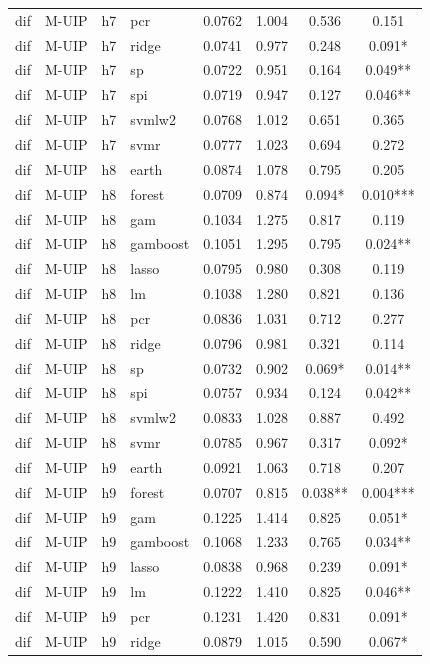 \begin{ThreePartTable}
\begin{longtable}[t]{llclcccc}
dif & M-UIP & h7 & pcr & 0.0762 & 1.004 & 0.536 & 0.151\\
dif & M-UIP & h7 & ridge & 0.0741 & 0.977 & 0.248 & 0.091*\\
dif & M-UIP & h7 & sp & 0.0722 & 0.951 & 0.164 & 0.049**\\
dif & M-UIP & h7 & spi & 0.0719 & 0.947 & 0.127 & 0.046**\\
dif & M-UIP & h7 & svmlw2 & 0.0768 & 1.012 & 0.651 & 0.365\\
dif & M-UIP & h7 & svmr & 0.0777 & 1.023 & 0.694 & 0.272\\
\addlinespace
dif & M-UIP & h8 & earth & 0.0874 & 1.078 & 0.795 & 0.205\\
dif & M-UIP & h8 & forest & 0.0709 & 0.874 & 0.094* & 0.010***\\
dif & M-UIP & h8 & gam & 0.1034 & 1.275 & 0.817 & 0.119\\
dif & M-UIP & h8 & gamboost & 0.1051 & 1.295 & 0.795 & 0.024**\\
dif & M-UIP & h8 & lasso & 0.0795 & 0.980 & 0.308 & 0.119\\
dif & M-UIP & h8 & lm & 0.1038 & 1.280 & 0.821 & 0.136\\
dif & M-UIP & h8 & pcr & 0.0836 & 1.031 & 0.712 & 0.277\\
dif & M-UIP & h8 & ridge & 0.0796 & 0.981 & 0.321 & 0.114\\
dif & M-UIP & h8 & sp & 0.0732 & 0.902 & 0.069* & 0.014**\\
dif & M-UIP & h8 & spi & 0.0757 & 0.934 & 0.124 & 0.042**\\
dif & M-UIP & h8 & svmlw2 & 0.0833 & 1.028 & 0.887 & 0.492\\
dif & M-UIP & h8 & svmr & 0.0785 & 0.967 & 0.317 & 0.092*\\
\addlinespace
dif & M-UIP & h9 & earth & 0.0921 & 1.063 & 0.718 & 0.207\\
dif & M-UIP & h9 & forest & 0.0707 & 0.815 & 0.038** & 0.004***\\
dif & M-UIP & h9 & gam & 0.1225 & 1.414 & 0.825 & 0.051*\\
dif & M-UIP & h9 & gamboost & 0.1068 & 1.233 & 0.765 & 0.034**\\
dif & M-UIP & h9 & lasso & 0.0838 & 0.968 & 0.239 & 0.091*\\
dif & M-UIP & h9 & lm & 0.1222 & 1.410 & 0.825 & 0.046**\\
dif & M-UIP & h9 & pcr & 0.1231 & 1.420 & 0.831 & 0.091*\\
dif & M-UIP & h9 & ridge & 0.0879 & 1.015 & 0.590 & 0.067*\\

\end{longtable}
\end{ThreePartTable}
